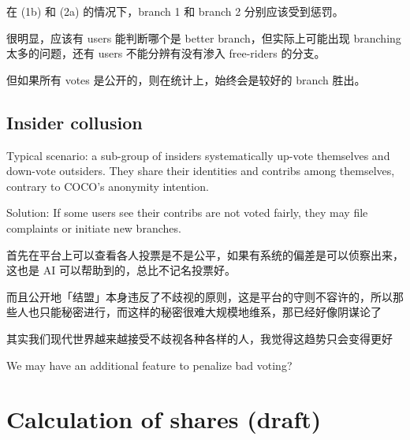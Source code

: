 \documentclass[12pt, orivec, fleqn]{article}
\newcommand{\cc}[2]{#1}
\newcommand{\cc}[2]{#2}
\begin{document}
\cc{
在 (1b) 和 (2a) 的情况下，branch 1 和 branch 2 分别应该受到惩罚。
}{
In cases (1b) and (2a), branch 1 and 2 should be penalized respectively.
}

\cc{
很明显，应该有 users 能判断哪个是 better branch，但实际上可能出现 branching 太多的问题，还有 users 不能分辨有没有渗入 free-riders 的分支。 
}{
Obviously, there should exist users who can determine which branches are better, but in practice there may be too many branches to consider.  Users may be unable to tell which branches are contaminated with free-riders. 
}

\cc{
但如果所有 votes 是公开的，则在统计上，始终会是较好的 branch 胜出。 
}{
However, if all votes are openly visible, then statistically we may believe that good branches will win out eventually.	
}

\secttoc
\subsection{Insider collusion}

Typical scenario:  a sub-group of insiders systematically up-vote themselves and down-vote outsiders.  They share their identities and contribs among themselves, contrary to COCO's anonymity intention.

Solution:  If some users see their contribs are not voted fairly, they may file complaints or initiate new branches.

\cc{
首先在平台上可以查看各人投票是不是公平，如果有系统的偏差是可以侦察出来，这也是 AI 可以帮助到的，总比不记名投票好。}{
On our platform, we can examine every vote to see if they are fair.  If there is systematic bias it can be detected by people or AI algorithms.  This is definitely an improvement over secret ballot.
}

\cc{
而且公开地「结盟」本身违反了不歧视的原则，这是平台的守则不容许的，所以那些人也只能秘密进行，而这样的秘密很难大规模地维系，那已经好像阴谋论了}{
It is clearly against Coco's policy to form off-platform ``alliances'' to try to influence voting.  Such collusions can only be conducted in secret and would be hard to maintain for large numbers of people.  
}

\cc{
其实我们现代世界越来越接受不歧视各种各样的人，我觉得这趋势只会变得更好}{
	
}

We may have an additional feature to penalize bad voting?

\secttoc
\section{Calculation of shares (draft)}
\end{document}
